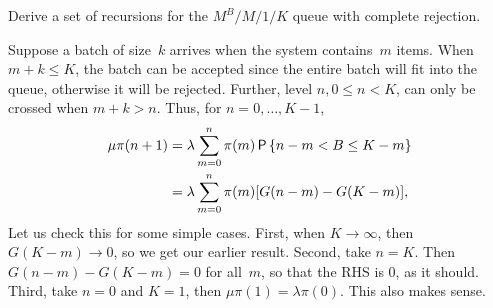 \documentclass[queueing-book.tex]{subfiles}
\begin{document}
\begin{exercise}\label{ex:l-156}
 Derive a set of recursions for the $M^B/M/1/K$ queue with complete rejection.
\begin{solution}
  Suppose a batch of size~$k$ arrives when the system contains~$m$ items.
  When $m+k \leq K$, the batch can be accepted since the entire batch will fit into the queue, otherwise it will be rejected.
  Further, level $n, 0\leq n < K$, can only be crossed when $m+k > n$.
  Thus, for $n=0,\ldots, K-1$,
 \begin{align*}
 \mu \pi(n+1) &= \lambda \sum_{m=0}^n \pi(m) \P{n-m < B \leq K-m} \\
&=\lambda \sum_{m=0}^n \pi(m) [G(n-m)-G(K-m)],
 \end{align*}
 Let us check this for some simple cases.
 First, when $K\to \infty$, then $G(K-m)\to 0$, so we get our earlier result.
 Second, take $n=K$.
 Then $G(n-m)-G(K-m)=0$ for all~$m$, so that the RHS is 0, as it should.
 Third, take $n=0$ and $K=1$, then $\mu \pi(1)= \lambda \pi(0)$.
 This also makes sense.
\end{solution}
\end{exercise}
\end{document}
